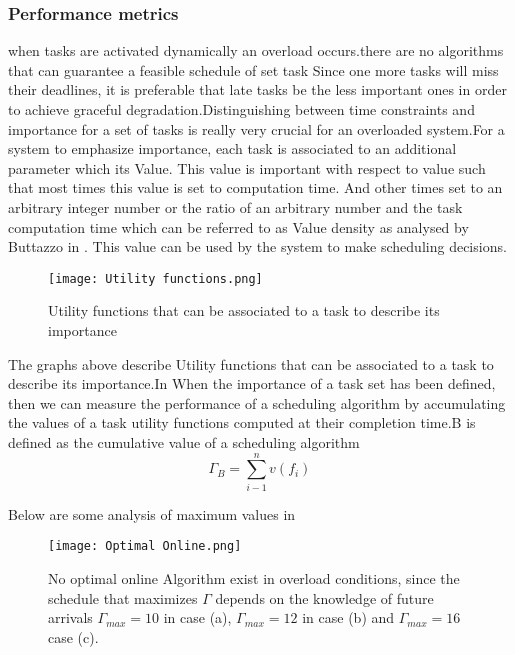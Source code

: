 \documentclass[conference]{IEEEtran}
\begin{document}
\subsubsection{Performance metrics}
when tasks are activated dynamically an overload occurs.there are no algorithms that can guarantee a feasible schedule of set task Since one more tasks will miss their deadlines, it is preferable that late tasks be the less important ones in order to achieve graceful degradation.Distinguishing between time constraints and importance for a set of tasks is really very crucial for an overloaded system.For a system to emphasize importance, each task is associated to an additional parameter which its Value. This value is important with respect to value such that most times this value is set to computation time. And other times set to an arbitrary integer number or the ratio of an arbitrary number and the task computation time which can be referred to as Value  density as analysed by Buttazzo in \cite{buttazzo2011hard}. This value can be used by the system to make scheduling decisions. 

\begin{figure}[htp]
    \centering
    \texttt{[image: Utility functions.png]}
    \cite{buttazzo2011hard}
    \caption{Utility functions that can be associated to a task to describe its importance}
    \label{fig:reg-gen}
\end{figure}

The graphs above describe Utility functions that can be associated to a task to describe its importance.In \cite{buttazzo2011hard} When the importance of a task set has been defined, then we can measure the performance of a scheduling algorithm by accumulating the values of a task utility functions computed at their completion time.B is defined as the cumulative value of a scheduling algorithm
\begin{equation} \label{equ:elastic}
    \Gamma_B = \sum_{i-1}^{n} v(f_i)
\end{equation}

Below are some analysis of maximum values in  \cite{buttazzo2011hard}

\begin{figure}[htp]
    \centering
    \texttt{[image: Optimal Online.png]}
    \cite{buttazzo2011hard}
    \caption{No optimal online Algorithm exist in overload conditions, since the schedule that maximizes $\Gamma$  depends  on  the knowledge  of  future  arrivals  $\Gamma_{max} = 10$  in case (a), $\Gamma_{max} = 12$ in case (b) and  $\Gamma_{max} = 16$ case (c).}
    \label{fig:reg-gen}
\end{figure}
\end{document}
